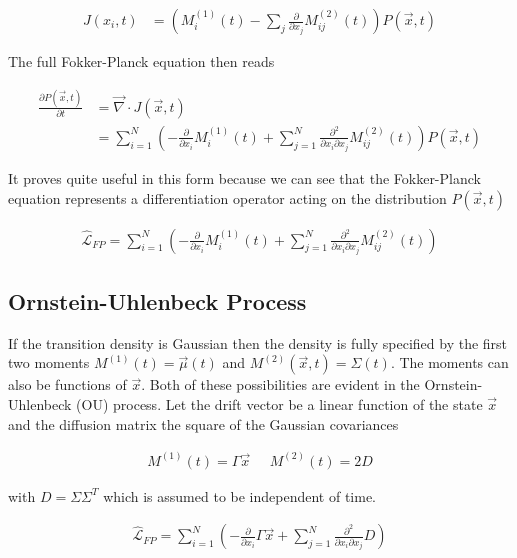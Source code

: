 \documentclass{article}
\begin{document}
\begin{align}
J(x_{i},t)  &= \left(M_{i}^{(1)}(t) - \sum_{j}\frac{\partial}{\partial x_{j}}M_{ij}^{(2)}(t) \right)P(\vec{x},t)
\end{align}

The full Fokker-Planck equation then reads

\begin{align}
\frac{\partial P(\vec{x},t)}{\partial t}  &= \vec{\nabla} \cdot J(\vec{x},t)\\
&= \sum_{i=1}^{N}\left(-\frac{\partial}{\partial x_{i}}M_{i}^{(1)}(t) + \sum_{j=1}^{N} \frac{\partial^{2}}{\partial x_{i}\partial x_{j}}M_{ij}^{(2)}(t)\right)P(\vec{x},t)
\end{align}

It proves quite useful in this form because we can see that the Fokker-Planck equation represents a differentiation operator acting on the distribution $P(\vec{x},t)$

\begin{align}
\hat{\mathcal{L}}_{FP} = \sum_{i=1}^{N}\left(-\frac{\partial}{\partial x_{i}}M_{i}^{(1)}(t) + \sum_{j=1}^{N} \frac{\partial^{2}}{\partial x_{i}\partial x_{j}}M_{ij}^{(2)}(t)\right)
\end{align}

\subsection{Ornstein-Uhlenbeck Process}

If the transition density is Gaussian then the density is fully specified by the first two moments $M^{(1)}(t) = \vec{\mu}(t)$ and $M^{(2)}(\vec{x},t) = \Sigma(t)$. The moments can also be functions of $\vec{x}$. Both of these possibilities are evident in the Ornstein-Uhlenbeck (OU) process. Let the drift vector be a linear function of the state $\vec{x}$ and the diffusion matrix the square of the Gaussian covariances

\begin{align*}
M^{(1)}(t) = \Gamma \vec{x}\;\;\;\;\;M^{(2)}(t) = 2D
\end{align*}

with $D = \Sigma\Sigma^{T}$ which is assumed to be independent of time.

\begin{align}
\hat{\mathcal{L}}_{FP} = \sum_{i=1}^{N}\left(-\frac{\partial}{\partial x_{i}}\Gamma\vec{x} + \sum_{j=1}^{N} \frac{\partial^{2}}{\partial x_{i}\partial x_{j}}D\right)
\end{align}
\end{document}
